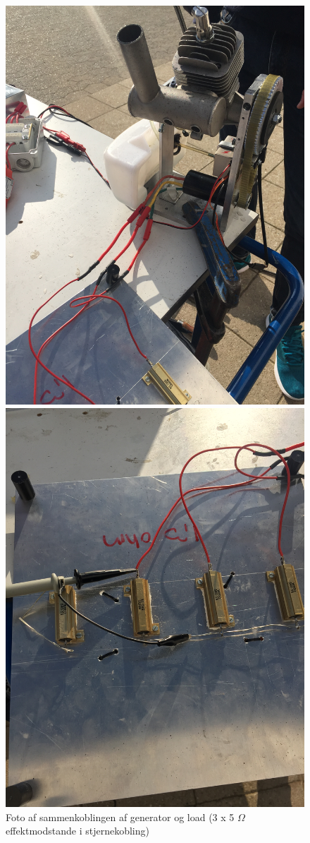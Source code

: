 \begin{figure}[!htb]
    \centering
    \begin{minipage}{.5\textwidth}
        \centering
  \includegraphics[angle=-90,width=0.8\linewidth]{testsetup2.JPG}
  \caption{Foto af sammenkoblingen af generator og load (3 x 5 $\Omega$ effektmodstande i stjernekobling)}
  \label{fig:testsetup2}
    \end{minipage}%
    \begin{minipage}{0.5\textwidth}
        \centering
  \includegraphics[angle=90,width=0.8\linewidth]{loadstjernekobling.JPG}

\end{minipage}
\end{figure}
